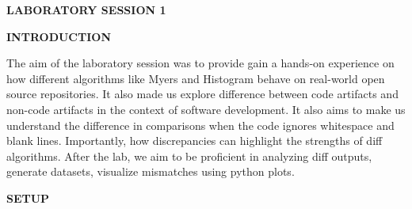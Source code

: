 \documentclass[12pt,a4paper]{article}
\newcommand{\sectionbar}[1]{%
  \vspace{0.6\baselineskip}%
  \noindent
  \colorbox{sectionbar}{%
    \parbox{\dimexpr\linewidth-2\fboxsep\relax}{%
      \textbf{\Large\textsf{#1}}%
    }%
  }%
  \vspace{0.6\baselineskip}
}
\begin{document}
\sectionbar{LABORATORY SESSION 1}

\sectionbar{INTRODUCTION}

\justifying
The aim of the laboratory session was to provide gain a hands-on experience on how different algorithms like Myers and Histogram behave on real-world open source repositories. It also made us explore difference between code artifacts and non-code artifacts in the context of software development. It also aims to make us understand the difference in comparisons when the code ignores whitespace and blank lines. Importantly, how discrepancies can highlight the strengths of diff algorithms. After the lab, we aim to be proficient in analyzing diff outputs, generate datasets, visualize mismatches using python plots.

\sectionbar{SETUP}
\end{document}
